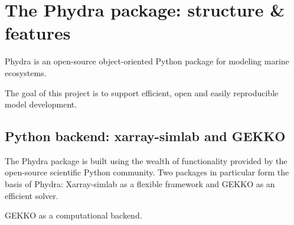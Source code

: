 \documentclass[template.tex]{subfiles}
\begin{document}

\section{The Phydra package: structure \& features} \label{Section:phydrapackage}


Phydra is an open-source object-oriented Python package for modeling marine ecosystems.



The goal of this project is to support efficient, open and easily reproducible model development. 

\subsection{Python backend: xarray-simlab and GEKKO}

The Phydra package is built using the wealth of functionality provided by the open-source scientific Python community. Two packages in particular form the basis of Phydra: Xarray-simlab as a flexible framework and GEKKO as an efficient solver.

GEKKO as a computational backend.
\end{document}
